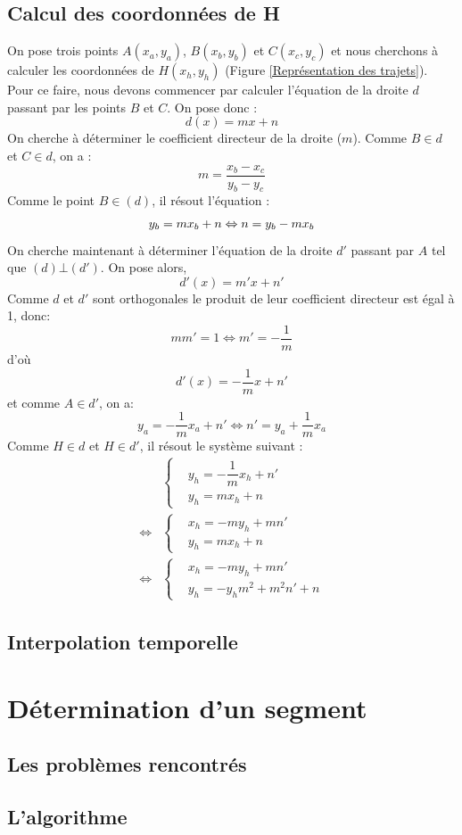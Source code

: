 \subsection{Calcul des coordonnées de H}
On pose trois points $ A(x_a,y_a) $, $ B(x_b,y_b) $ et $ C(x_c,y_c) $ et nous cherchons à calculer les coordonnées de $ H(x_h,y_h) $ (Figure \ref{Représentation des trajets}).
Pour ce faire, nous devons commencer par calculer l'équation de la droite $ d $ passant par les points $B$ et $C$.
On pose donc : 
\[
 d(x) = mx + n
\]
On cherche à déterminer le coefficient directeur de la droite ($m$). Comme $B \in d$ et $C \in d$, on a :
\[
   m =  \frac{x_b-x_c}{y_b-y_c}
\]
Comme le point $B \in (d)$, il résout l'équation :
\[
   y_b = mx_b + n \\
   \Leftrightarrow n = y_b - mx_b
\]
On cherche maintenant à déterminer l'équation de la droite $ d' $ passant par $ A $ tel que $ (d)\bot (d') $. On pose alors, 
 \[
 d'(x) = m'x + n'
\]
Comme $d$ et $d'$ sont orthogonales le produit de leur coefficient directeur est égal à 1, donc:
\[
	mm' = 1 \Leftrightarrow m' = -\frac{1}{m}	
\]
d'où
\[
	d'(x) = -\frac{1}{m}x+n'
\]
et comme $ A \in d' $, on a:
\[
	y_a = -\frac{1}{m}x_a + n' \Leftrightarrow n' = y_a + \frac{1}{m}x_a
\]
Comme $ H \in d$ et $H \in d'$, il résout le système suivant :
\begin{align}
    &\begin{cases}
   		 & y_h = -\dfrac{1}{m}x_h + n'\\
   		 & y_h = mx_h + n
    \end{cases} \\
    \Leftrightarrow
    &\begin{cases}
   		& x_h = -my_h + mn'\\
    	& y_h = mx_h + n
    \end{cases} \\
     \Leftrightarrow
    &\begin{cases}
   		& x_h = -my_h + mn'\\
    	& y_h = -y_hm^2 + m^2n' + n
    \end{cases}
\end{align}
\subsection{Interpolation temporelle}

\section{Détermination d'un segment}
\subsection{Les problèmes rencontrés}
\subsection{L'algorithme}